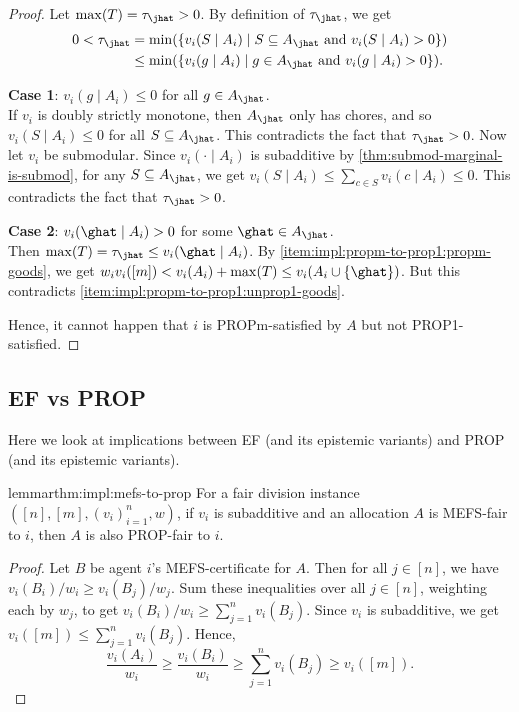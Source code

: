 \begin{proof}
Let $\max(T) = \tau_{\jhat} > 0$. By definition of $\tau_{\jhat}$, we get
\begin{align*}
0 < \tau_{\jhat} &= \min(\{v_i(S \mid A_i) \mid S \subseteq A_{\jhat} \textrm{ and } v_i(S \mid A_i) > 0\})
\\ &\le \min(\{v_i(g \mid A_i) \mid g \in A_{\jhat} \textrm{ and } v_i(g \mid A_i) > 0\}).
\end{align*}

\textbf{Case 1}: $v_i(g \mid A_i) \le 0$ for all $g \in A_{\jhat}$.
\\ If $v_i$ is doubly strictly monotone, then $A_{\jhat}$ only has chores,
and so $v_i(S \mid A_i) \le 0$ for all $S \subseteq A_{\jhat}$.
This contradicts the fact that $\tau_{\jhat} > 0$.
Now let $v_i$ be submodular.
Since $v_i(\cdot \mid A_i)$ is subadditive by \cref{thm:submod-marginal-is-submod},
for any $S \subseteq A_{\jhat}$, we get
$v_i(S \mid A_i) \le \sum_{c \in S} v_i(c \mid A_i) \le 0$.
This contradicts the fact that $\tau_{\jhat} > 0$.

\textbf{Case 2}: $v_i(\ghat \mid A_i) > 0$ for some $\ghat \in A_{\jhat}$.
\\ Then $\max(T) = \tau_{\jhat} \le v_i(\ghat \mid A_i)$.
By \ref{item:impl:propm-to-prop1:propm-goods}, we get
$w_iv_i([m]) < v_i(A_i) + \max(T) \le v_i(A_i \cup \{\ghat\})$.
But this contradicts \ref{item:impl:propm-to-prop1:unprop1-goods}.

Hence, it cannot happen that $i$ is PROPm-satisfied by $A$ but not PROP1-satisfied.
\end{proof}

\subsection{EF vs PROP}
\label{sec:impls-extra:ef-vs-prop}

Here we look at implications between EF (and its epistemic variants) and PROP (and its epistemic variants).

\begin{restatable}{lemma}{rthm:impl:mefs-to-prop}
\label{thm:impl:mefs-to-prop}
For a fair division instance $([n], [m], (v_i)_{i=1}^n, w)$,
if $v_i$ is subadditive and an allocation $A$ is MEFS-fair to $i$, then $A$ is also PROP-fair to $i$.
\end{restatable}
\begin{proof}
Let $B$ be agent $i$'s MEFS-certificate for $A$.
Then for all $j \in [n]$, we have $v_i(B_i)/w_i \ge v_i(B_j)/w_j$.
Sum these inequalities over all $j \in [n]$, weighting each by $w_j$,
to get $v_i(B_i)/w_i \ge \sum_{j=1}^n v_i(B_j)$.
Since $v_i$ is subadditive, we get $v_i([m]) \le \sum_{j=1}^n v_i(B_j)$.
Hence,
\[ \frac{v_i(A_i)}{w_i} \ge \frac{v_i(B_i)}{w_i} \ge \sum_{j=1}^n v_i(B_j) \ge v_i([m]). \]
\end{proof}


